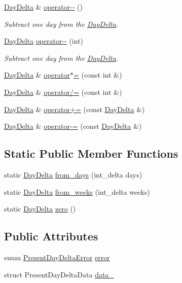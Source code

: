 \begin{DoxyCompactItemize}
\hyperlink{structDayDelta}{\-Day\-Delta} \& \hyperlink{structDayDelta_aa0ca3c6a73df1946150a1c7e555b79b9}{operator-\/-\/} ()
\begin{DoxyCompactList}\small\item\em \-Subtract one day from the \hyperlink{structDayDelta}{\-Day\-Delta}. \end{DoxyCompactList}\item 
\hyperlink{structDayDelta}{\-Day\-Delta} \hyperlink{structDayDelta_a7e0ffb0cc2aeff7414fee2edfb8e3424}{operator-\/-\/} (int)
\begin{DoxyCompactList}\small\item\em \-Subtract one day from the \hyperlink{structDayDelta}{\-Day\-Delta}. \end{DoxyCompactList}\item 
\hyperlink{structDayDelta}{\-Day\-Delta} \& \hyperlink{structDayDelta_ac8af8f0ee6001377aac49a5620a9f200}{operator$\ast$=} (const int \&)
\item 
\hyperlink{structDayDelta}{\-Day\-Delta} \& \hyperlink{structDayDelta_a06fe33615accc5c07c9d7c79e1c2e92f}{operator/=} (const int \&)
\item 
\hyperlink{structDayDelta}{\-Day\-Delta} \& \hyperlink{structDayDelta_acb705c5865b8439db80762adf0c45f13}{operator+=} (const \hyperlink{structDayDelta}{\-Day\-Delta} \&)
\item 
\hyperlink{structDayDelta}{\-Day\-Delta} \& \hyperlink{structDayDelta_a9f12d06900c7480bdf21b5f27d1eaeef}{operator-\/=} (const \hyperlink{structDayDelta}{\-Day\-Delta} \&)
\end{DoxyCompactItemize}
\subsection*{\-Static \-Public \-Member \-Functions}
\begin{DoxyCompactItemize}
\item 
static \hyperlink{structDayDelta}{\-Day\-Delta} \hyperlink{structDayDelta_a7421a2d8448dd7d5329d72d0d6a04cbd}{from\-\_\-days} (int\-\_\-delta days)
\item 
static \hyperlink{structDayDelta}{\-Day\-Delta} \hyperlink{structDayDelta_a871bbf34275016d74c7ef8c8777c3258}{from\-\_\-weeks} (int\-\_\-delta weeks)
\item 
static \hyperlink{structDayDelta}{\-Day\-Delta} \hyperlink{structDayDelta_acfcc09473305041a930a1ea6a3c20409}{zero} ()
\end{DoxyCompactItemize}
\subsection*{\-Public \-Attributes}
\begin{DoxyCompactItemize}
\item 
enum \hyperlink{day-delta_8h_a1fc28c3187bc8bcf286a214ee7168f8f}{\-Present\-Day\-Delta\-Error} \hyperlink{structDayDelta_a240b38d4510157302ec42efc62ee498d}{error}
\item 
struct \-Present\-Day\-Delta\-Data \hyperlink{structDayDelta_af256f16b6700e43995186eea83db9ebc}{data\-\_\-}
\end{DoxyCompactItemize}

